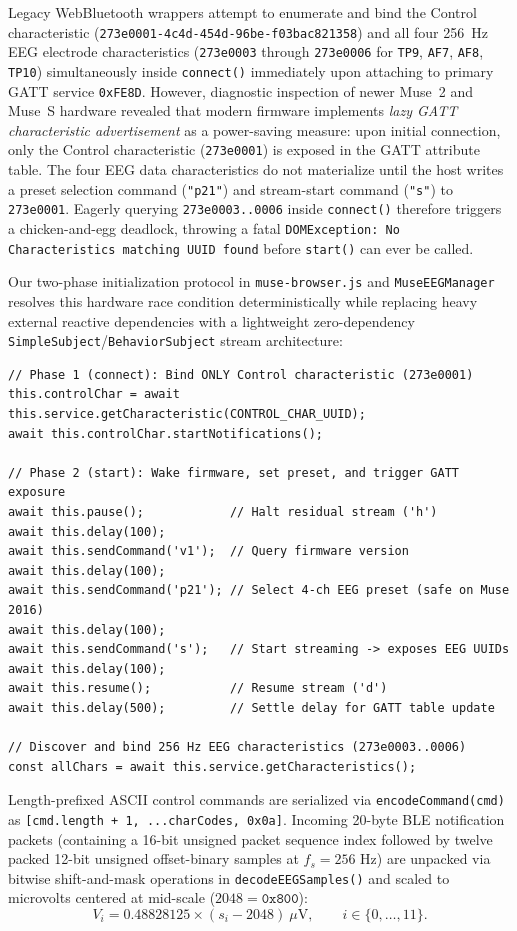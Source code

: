 \documentclass[10pt,twocolumn]{article}
\begin{document}
Legacy WebBluetooth wrappers attempt to enumerate and bind the Control characteristic (\texttt{273e0001-4c4d-454d-96be-f03bac821358}) and all four 256~Hz EEG electrode characteristics (\texttt{273e0003} through \texttt{273e0006} for \texttt{TP9}, \texttt{AF7}, \texttt{AF8}, \texttt{TP10}) simultaneously inside \texttt{connect()} immediately upon attaching to primary GATT service \texttt{0xFE8D}. However, diagnostic inspection of newer Muse~2 and Muse~S hardware revealed that modern firmware implements \emph{lazy GATT characteristic advertisement} as a power-saving measure: upon initial connection, only the Control characteristic (\texttt{273e0001}) is exposed in the GATT attribute table. The four EEG data characteristics do not materialize until the host writes a preset selection command (\texttt{"p21"}) and stream-start command (\texttt{"s"}) to \texttt{273e0001}. Eagerly querying \texttt{273e0003..0006} inside \texttt{connect()} therefore triggers a chicken-and-egg deadlock, throwing a fatal \texttt{DOMException: No Characteristics matching UUID found} before \texttt{start()} can ever be called.

Our two-phase initialization protocol in \texttt{muse-browser.js} and \texttt{MuseEEGManager} resolves this hardware race condition deterministically while replacing heavy external reactive dependencies with a lightweight zero-dependency \texttt{SimpleSubject}/\texttt{BehaviorSubject} stream architecture:
\begin{lstlisting}
// Phase 1 (connect): Bind ONLY Control characteristic (273e0001)
this.controlChar = await this.service.getCharacteristic(CONTROL_CHAR_UUID);
await this.controlChar.startNotifications();

// Phase 2 (start): Wake firmware, set preset, and trigger GATT exposure
await this.pause();            // Halt residual stream ('h')
await this.delay(100);
await this.sendCommand('v1');  // Query firmware version
await this.delay(100);
await this.sendCommand('p21'); // Select 4-ch EEG preset (safe on Muse 2016)
await this.delay(100);
await this.sendCommand('s');   // Start streaming -> exposes EEG UUIDs
await this.delay(100);
await this.resume();           // Resume stream ('d')
await this.delay(500);         // Settle delay for GATT table update

// Discover and bind 256 Hz EEG characteristics (273e0003..0006)
const allChars = await this.service.getCharacteristics();
\end{lstlisting}
Length-prefixed ASCII control commands are serialized via \texttt{encodeCommand(cmd)} as \texttt{[cmd.length + 1, ...charCodes, 0x0a]}. Incoming 20-byte BLE notification packets (containing a 16-bit unsigned packet sequence index followed by twelve packed 12-bit unsigned offset-binary samples at $f_s = 256\text{ Hz}$) are unpacked via bitwise shift-and-mask operations in \texttt{decodeEEGSamples()} and scaled to microvolts centered at mid-scale ($2048 = \texttt{0x800}$):
\begin{equation}
V_{i} = 0.48828125 \times \left( s_{i} - 2048 \right) \ \mu\text{V}, \qquad i \in \{0, \dots, 11\}.
\end{equation}
\end{document}
